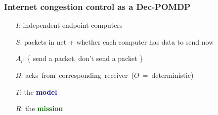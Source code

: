 \documentclass[svgnames]{beamer}
\begin{document}
\begin{frame}
\frametitle{Internet congestion control as a Dec-POMDP}

\begin{itemize}

\item[$I$:] independent endpoint computers

\pause

\item[$S$:] packets in net + whether each computer has data to send now

\pause

\item[$A_i$:] \{ send a packet, don't send a packet \}

\pause

\item[$\Omega$:] \mbox{acks from corresponding receiver ($O$ = deterministic)}

\pause

\item[$T$:] the \textbf{\textcolor{DarkBlue}{model}}

\pause

\item[$R$:] the \textbf{\textcolor{DarkGreen}{mission}}

\item[]

\pause

\item[] 

\end{itemize}

\end{frame}
\end{document}
